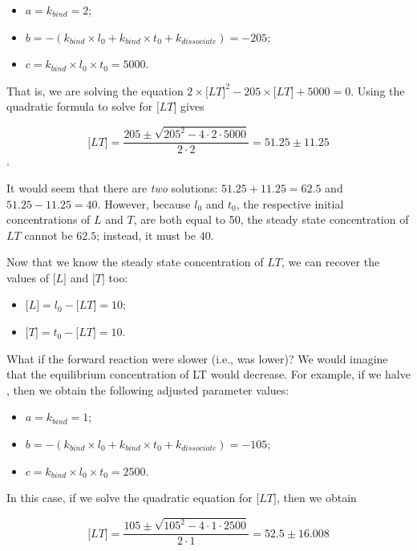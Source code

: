 \begin{itemize}
 \item $a = k_{bind} = 2$;
 \item $b = - (k_{bind} \times l_0 + k_{bind} \times t_0 + k_{dissociate}) = -205$;
 \item $c = k_{bind} \times l_0 \times t_0 = 5000$.
\end{itemize}

That is, we are solving the equation $2 \times \text{[}LT\text{]}^2 - 205 \times \text{[}LT\text{]} + 5000 = 0$. Using the quadratic formula to solve for $\text{[}LT\text{]}$ gives

$$\text{[}LT\text{]} = \frac{205 \pm \sqrt{205^2 - 4 \cdot 2 \cdot 5000}}{2 \cdot 2} = 51.25 \pm 11.25$$.

It would seem that there are \textit{two} solutions: $51.25 + 11.25 = 62.5$ and $51.25 - 11.25 = 40$. However, because $l_0$ and $t_0$, the respective initial concentrations of $L$ and $T$, are both equal to 50, the steady state concentration of $LT$ cannot be $62.5$; instead, it must be $40$.

Now that we know the steady state concentration of $LT$, we can recover the values of $\text{[}L\text{]}$ and $\text{[}T\text{]}$ too:

\begin{itemize}
 \item $\text{[}L\text{]} = l_0 - \text{[}LT\text{]} = 10$;
 \item $\text{[}T\text{]} = t_0 - \text{[}LT\text{]} = 10$.
\end{itemize}

What if the forward reaction were slower (i.e.,  was lower)? We would imagine that the equilibrium concentration of \text{[}LT\text{]} would decrease. For example, if we halve , then we obtain the following adjusted parameter values:

\begin{itemize}
 \item $a = k_{bind} = 1$;
 \item $b = - (k_{bind} \times l_0 + k_{bind} \times t_0 + k_{dissociate}) = -105$;
 \item $c = k_{bind} \times l_0 \times t_0 = 2500$.
\end{itemize}

In this case, if we solve the quadratic equation for $\text{[}LT\text{]}$, then we obtain

$$\text{[}LT\text{]} = \frac{105 \pm \sqrt{105^2 - 4 \cdot 1 \cdot 2500}}{2 \cdot 1} = 52.5 \pm 16.008$$

